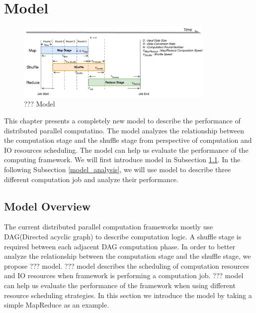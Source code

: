 {\color{blue}
\section{Model}\label{model}

\begin{figure}
    \centering
	\includegraphics[width=0.85\textwidth]{fig/model_basic}
	\caption{\color{blue}??? Model}
    \label{fig:model_basic}
    \vspace{-1em}
\end{figure}

This chapter presents a completely new model to describe the performance of distributed parallel computatino. The model analyzes the relationship between the computation stage and the shuffle stage from perspective of computation and IO resources scheduling. The model can help us evaluate the performance of the computing framework. We will first introduce model in Subsection \ref{model_overview}. In the following Subsection \ref{model_analysis}, we will use model to describe three different computation job and analyze their performance.

\subsection{Model Overview}\label{model_overview}
The current distributed parallel computation frameworks mostly use DAG(Directed acyclic graph) to describe computation logic. A shuffle stage is required between each adjacent DAG computation phase. In order to better analyze the relationship between the computation stage and the shuffle stage, we propose ??? model. ??? model describes the scheduling of computation resources and IO resources when framework is performing a computation job. ??? model can help us evaluate the performance of the framework when using different resource scheduling strategies. In this section we introduce the model by taking a simple MapReduce as an example.

}
